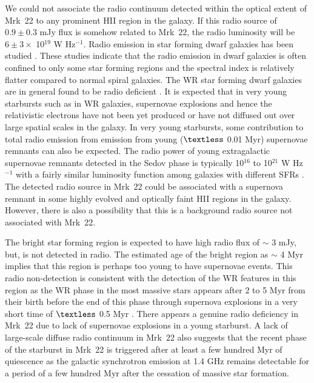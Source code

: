 \documentclass[useAMS,usenatbib]{mn2e}
\begin{document}
We could not associate the radio continuum detected within the optical extent of Mrk~22 to any prominent H{\small{II}} region in the galaxy. If this radio source of $0.9\pm0.3$ mJy flux is somehow related to Mrk~22, the radio luminosity will be $6\pm3 \times$ 10$^{19}$ W Hz$^{-1}$. Radio emission in star forming dwarf galaxies has been studied \citep{1984A&A...141..241K,1986sfdg.conf..281B,1986A&A...161..155K,1991A&A...246..323K,1993ApJ...410..626D,
2003ApJ...597..274Y,2005A&A...436..837H,2011ApJ...728..124R}. These studies indicate that the radio emission in dwarf galaxies is often confined to only some star forming regions and the spectral index is relatively flatter compared to normal spiral galaxies. The WR star forming dwarf galaxies are in general found to be radio deficient \citep{2016MNRAS.462...92J}. It is expected that in very young starbursts such as in WR galaxies, supernovae explosions and hence the relativistic electrons have not been yet produced or have not diffused out over large spatial scales in the galaxy. In very young starbursts, some contribution to total radio emission from emission from young ($\textless$ 0.01 Myr) supernovae remnants can also be expected. The radio power of young extragalactic supernovae remnants detected in the Sedov phase \citep[cf.,][]{1959sdmm.book.....S,1986A&A...166..257B,1998ApJS..117...89G,1999ApJS..120..247G,2004A&A...427..525B} is typically 10$^{16}$ to 10$^{21}$ W Hz$^{-1}$ with a fairly similar luminosity function among galaxies with different SFRs \citep{2009ApJ...703..370C}. The detected radio source in Mrk~22 could be associated with a supernova remnant in some highly evolved and optically faint H{\small{II}} regions in the galaxy. However, there is also a possibility that this is a background radio source not associated with Mrk~22.

The bright star forming region is expected to have high radio flux of $\sim$ 3 mJy, but, is not detected in radio. The estimated age of the bright region as $\sim$ 4 Myr implies that this region is perhaps too young to have supernovae events. This radio non-detection is consistent with the detection of the WR features in this region as the WR phase in the most massive stars appears after 2 to 5 Myr from their birth before the end of this phase through supernova explosions in a very short time of $\textless$ 0.5 Myr \citep{2005A&A...429..581M}. There appears a genuine radio deficiency in Mrk~22 due to lack of supernovae explosions in a young starburst. A lack of large-scale diffuse radio continuum in Mrk~22 also suggests that the recent phase of the starburst in Mrk~22 is triggered after at least a few hundred Myr of quiescence as the galactic synchrotron emission at 1.4 GHz remains detectable for a period of a few hundred Myr after the cessation of massive star formation.
\end{document}
